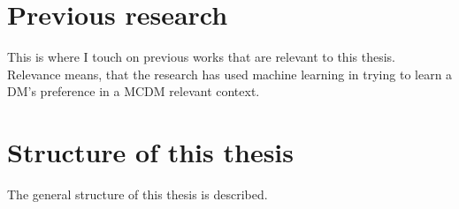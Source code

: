 \section{Previous research}
{\color{red}
This is where I touch on previous works that are relevant to this thesis. Relevance means, that the research has
used machine learning in trying to learn a DM's preference in a MCDM relevant context.
}

\section{Structure of this thesis}
{\color{red}
The general structure of this thesis is described.
}